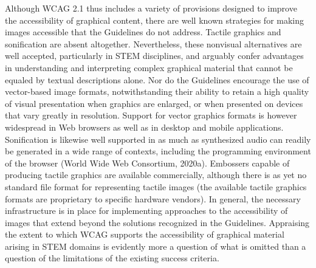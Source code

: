 \documentclass{sig-alternate} %
\begin{document}
\begin{large}
Although WCAG 2.1 thus includes a variety of provisions designed to improve the accessibility of graphical content, there are well known strategies for making images accessible that the Guidelines do not address. Tactile graphics and sonification are absent altogether. Nevertheless, these nonvisual alternatives are well accepted, particularly in STEM disciplines, and arguably confer advantages in understanding and interpreting complex graphical material that cannot be equaled by textual descriptions alone. Nor do the Guidelines encourage the use of vector-based image formats, notwithstanding their ability to retain a high quality of visual presentation when graphics are enlarged, or when presented on devices that vary greatly in resolution. Support for vector graphics formats is however widespread in Web browsers as well as in desktop and mobile applications. Sonification is likewise well supported in as much as synthesized audio can readily be generated in a wide range of contexts, including the programming environment of the browser (World Wide Web Consortium, 2020a). Embossers capable of producing tactile graphics are available commercially, although there is as yet no standard file format for representing tactile images (the available tactile graphics formats are proprietary to specific hardware vendors). In general, the necessary infrastructure is in place for implementing approaches to the accessibility of images that extend beyond the solutions recognized in the Guidelines. Appraising the extent to which WCAG supports the accessibility of graphical material arising in STEM domains is evidently more a question of what is omitted than a question of the limitations of the existing success criteria.


\end{large}
\end{document}
